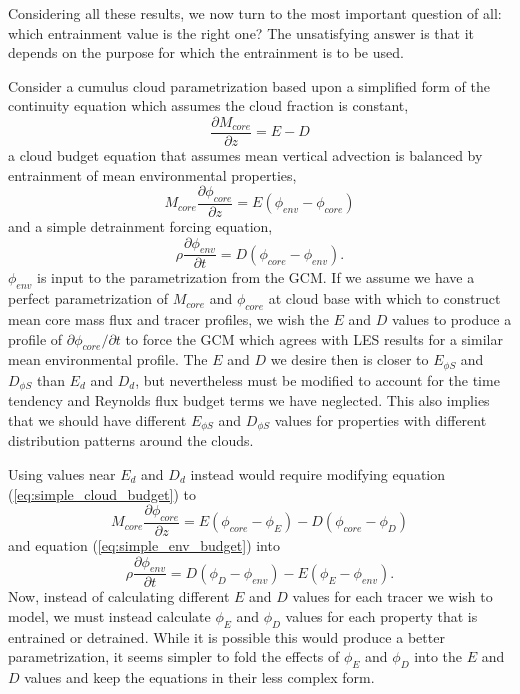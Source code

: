 \documentclass[12pt]{article}
\begin{document}
Considering all these results, we now turn to the most important question of 
all: which entrainment value is the right one?  The unsatisfying answer is that
it depends on the purpose for which the entrainment is to be used.

Consider a cumulus cloud parametrization based upon a simplified form of the continuity equation which assumes the cloud fraction is constant,
\begin{equation}
    \label{eq:simple_continuity}
    \frac{\partial M_{core}}{\partial z} = E - D
\end{equation}
a cloud budget equation that assumes mean vertical advection is balanced by 
entrainment of mean environmental properties,
\begin{equation}
    \label{eq:simple_cloud_budget}
    M_{core} \frac{\partial \phi_{core}}{\partial z} = E(\phi_{env} - \phi_{core})
\end{equation}
and a simple detrainment forcing equation,
\begin{equation}
    \label{eq:simple_env_budget}
    \rho \frac{\partial \phi_{env}}{\partial t} = D(\phi_{core} - \phi_{env}).
\end{equation}
$\phi_{env}$ is input to the parametrization from the GCM.  If we assume 
we have a perfect parametrization of $M_{core}$ and $\phi_{core}$ at cloud base with
which to construct mean core mass flux and tracer profiles, we wish the $E$ 
and $D$ values to produce a profile of $\partial \phi_{core} / \partial t$ 
to force the GCM which agrees with LES results for a similar mean environmental
profile.  The $E$ and $D$ we desire then is closer to $E_{\phi S}$ and $D_{\phi S}$
than $E_d$ and $D_d$, but nevertheless must be modified to account for the 
time tendency and Reynolds flux budget terms we have neglected.  This also 
implies that we should have different $E_{\phi S}$ and $D_{\phi S}$ values for 
properties with different distribution patterns around the clouds.

Using values near $E_d$ and $D_d$ instead would require modifying equation 
(\ref{eq:simple_cloud_budget}) to
\begin{equation}
    \label{eq:less_simple_cloud_budget}
    M_{core} \frac{\partial \phi_{core}}{\partial z} 
       = E(\phi_{core} - \phi_E) - D(\phi_{core} - \phi_D)
\end{equation}
and equation (\ref{eq:simple_env_budget}) into
\begin{equation}
    \label{eq:less_simple_env_budget}
    \rho \frac{\partial \phi_{env}}{\partial t} 
       = D(\phi_D - \phi_{env}) - E(\phi_E - \phi_{env}).
\end{equation}
Now, instead of calculating different $E$ and $D$ values for each tracer we 
wish to model, we must instead calculate $\phi_E$ and $\phi_D$ values for 
each property that is entrained or detrained.  While it is possible this would
produce a better parametrization, it seems simpler to fold the effects of 
$\phi_E$ and $\phi_D$ into the $E$ and $D$ values and keep the equations in 
their less complex form.
\end{document}
